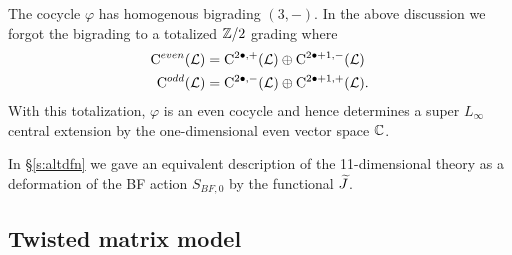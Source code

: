 The cocycle $\varphi$ has homogenous bigrading $(3,-)$.
In the above discussion we forgot the bigrading to a totalized $\mathbb Z/2$ grading where 
\begin{align*}
{\rm C}^{even} (\mathcal L) & = {\rm C}^{2\bullet , +} (\mathcal L) \oplus {\rm C}^{2\bullet+1, -}(\mathcal L) \\
{\rm C}^{odd} (\mathcal L) & = {\rm C}^{2\bullet , -} (\mathcal L) \oplus {\rm C}^{2\bullet+1, +}(\mathcal L) .
\end{align*}
With this totalization, $\varphi$ is an even cocycle and hence determines a super $L_\infty$ central extension by the one-dimensional even vector space $\mathbb C$. 

\parsec[s:altglobal]

In \S \ref{s:altdfn} we gave an equivalent description of the 11-dimensional theory as a deformation of the BF action $S_{BF,0}$ by the functional $\widetilde J$. 

\subsection{Twisted matrix model}